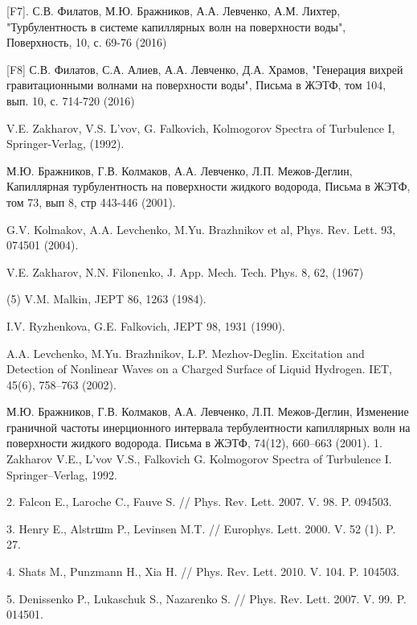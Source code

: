 [F7]. С.В. Филатов, М.Ю. Бражников, А.А. Левченко,  А.М. Лихтер, "Турбулентность в системе капиллярных волн на поверхности воды", Поверхность, 10, с. 69-76 (2016)

[F8] С.В. Филатов, С.А. Алиев, А.А. Левченко, Д.А. Храмов, "Генерация вихрей гравитационными волнами на поверхности воды", Письма в ЖЭТФ, том 104, вып.  10, с. 714-720 (2016)


\begin{thebibliography}{99}

V.E. Zakharov, V.S. L'vov, G. Falkovich, Kolmogorov Spectra of Turbulence I, Springer-Verlag, (1992).

М.Ю. Бражников, Г.В. Колмаков, А.А. Левченко, Л.П. Межов-Деглин, Капиллярная турбулентность на поверхности жидкого водорода, Письма в ЖЭТФ, том 73, вып 8, стр 443-446 (2001).
 
G.V. Kolmakov, A.A. Levchenko, M.Yu. Brazhnikov et al, Phys. Rev. Lett. 93, 074501 (2004).

V.E. Zakharov, N.N. Filonenko, J. App. Mech. Tech. Phys. 8, 62, (1967)

\bibitem(5)
V.M. Malkin, JEPT 86, 1263 (1984).

I.V. Ryzhenkova, G.E. Falkovich, JEPT 98, 1931 (1990).

A.A. Levchenko, M.Yu. Brazhnikov, L.P. Mezhov-Deglin. Excitation and Detection of Nonlinear Waves on a Charged Surface of Liquid Hydrogen. IET, 45(6), 758–763 (2002).

М.Ю. Бражников, Г.В. Колмаков, А.А. Левченко, Л.П. Межов-Деглин, Изменение граничной частоты инерционного интервала тербулентности капиллярных волн на поверхности жидкого водорода. Письма в ЖЭТФ, 74(12), 660–663 (2001).
1. Zakharov V.E., L’vov V.S., Falkovich G. Kolmogorov Spectra of Turbulence I. Springer–Verlag, 1992.

2. Falcon E., Laroche C., Fauve S. // Phys. Rev. Lett. 2007. V. 98. P. 094503.

3. Henry E., Alstrшm P., Levinsen M.T. // Europhys. Lett. 2000. V. 52 (1). P. 27.

4. Shats M., Punzmann H., Xia H. // Phys. Rev. Lett. 2010. V. 104. P. 104503.

5. Denissenko P., Lukaschuk S., Nazarenko S. // Phys. Rev. Lett. 2007. V. 99. P. 014501.


\end{thebibliography}
